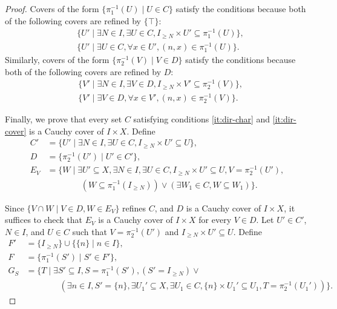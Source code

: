 \documentclass[pdflatex,sn-mathphys-num]{sn-jnl}
\theoremstyle{definition}
\theoremstyle{remark}
\numberwithin{figure}{section}
\begin{document}
\begin{proof}
Covers of the form $\{ \pi_1^{-1}(U) \mid U \in C \}$ satisfy the conditions because both of the following covers are refined by $\{ \top \}$:
\begin{align*}
& \{ U' \mid \exists N \in I, \exists U \in C, I_{\geq N} \times U' \subseteq \pi_1^{-1}(U) \}, \\
& \{ U' \mid \exists U \in C, \forall x \in U', (n,x) \in \pi_1^{-1}(U) \}.
\end{align*}
Similarly, covers of the form $\{ \pi_2^{-1}(V) \mid V \in D \}$ satisfy the conditions because both of the following covers are refined by $D$:
\begin{align*}
& \{ V' \mid \exists N \in I, \exists V \in D, I_{\geq N} \times V' \subseteq \pi_2^{-1}(V) \}, \\
& \{ V' \mid \exists V \in D, \forall x \in V', (n,x) \in \pi_2^{-1}(V) \}.
\end{align*}

Finally, we prove that every set $C$ satisfying conditions \eqref{it:dir-char} and \eqref{it:dir-cover} is a Cauchy cover of $I \times X$.
Define
\begin{align*}
C' & = \{ U' \mid \exists N \in I, \exists U \in C, I_{\geq N} \times U' \subseteq U \}, \\
D & = \{ \pi_2^{-1}(U') \mid U' \in C' \}, \\
E_V & = \{ W \mid \exists U' \subseteq X, \exists N \in I, \exists U \in C, I_{\geq N} \times U' \subseteq U, V = \pi_2^{-1}(U'), \\
& \qquad \qquad (W \subseteq \pi_1^{-1}(I_{\geq N})) \lor (\exists W_1 \in C, W \subseteq W_1) \}.
\end{align*}

Since $\{ V \cap W \mid V \in D, W \in E_V \}$ refines $C$, and $D$ is a Cauchy cover of $I \times X$, it suffices to check that $E_V$ is a Cauchy cover of $I \times X$ for every $V \in D$.
Let $U' \in C'$, $N \in I$, and $U \in C$ such that $V = \pi_2^{-1}(U')$ and $I_{\geq N} \times U' \subseteq U$.
Define
\begin{align*}
F' & = \{ I_{\geq N} \} \cup \{ \{ n \} \mid n \in I \}, \\
F & = \{ \pi_1^{-1}(S') \mid S' \in F' \}, \\
G_S & = \{ T \mid \exists S' \subseteq I, S = \pi_1^{-1}(S'), (S' = I_{\geq N}) \lor \\
& \qquad \qquad (\exists n \in I, S' = \{ n \}, \exists U_1' \subseteq X, \exists U_1 \in C, \{ n \} \times U_1' \subseteq U_1, T = \pi_2^{-1}(U_1')) \}.
\end{align*}


\end{proof}
\end{document}
